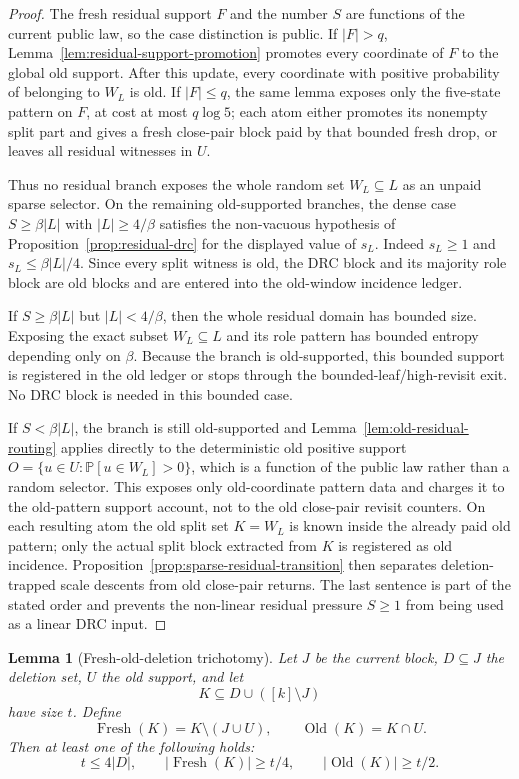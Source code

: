 \documentclass[11pt]{article}
\newtheorem{lemma}[theorem]{Lemma}
\newcommand{\Prb}{\mathbb P}
\begin{document}
\begin{proof}
The fresh residual support $F$ and the number $S$ are functions of the
current public law, so the case distinction is public.  If $|F|>q$,
Lemma~\ref{lem:residual-support-promotion} promotes every coordinate of $F$
to the global old support.  After this update, every coordinate with positive
probability of belonging to $W_L$ is old.  If $|F|\le q$, the same lemma
exposes only the five-state pattern on $F$, at cost at most $q\log 5$; each
atom either promotes its nonempty split part and gives a fresh close-pair block
paid by that bounded fresh drop, or leaves all residual witnesses in $U$.

Thus no residual branch exposes the whole random set $W_L\subseteq L$ as an
unpaid sparse selector.  On the remaining old-supported branches, the dense case
$S\ge\beta |L|$ with $|L|\ge4/\beta$ satisfies the non-vacuous hypothesis of
Proposition~\ref{prop:residual-drc} for the displayed value of $s_L$.  Indeed
$s_L\ge1$ and $s_L\le\beta |L|/4$.  Since every split witness is old, the DRC
block and its majority role block are old blocks and are entered into the
old-window incidence ledger.

If $S\ge\beta |L|$ but $|L|<4/\beta$, then the whole residual domain has bounded
size.  Exposing the exact subset $W_L\subseteq L$ and its role pattern has
bounded entropy depending only on $\beta$.  Because the branch is old-supported,
this bounded support is registered in the old ledger or stops through the
bounded-leaf/high-revisit exit.  No DRC block is needed in this bounded case.

If $S<\beta |L|$, the branch is still old-supported and
Lemma~\ref{lem:old-residual-routing} applies directly to the deterministic old
positive support $O=\{u\in U:\Prb[u\in W_L]>0\}$, which is a function of the
public law rather than a random selector.  This exposes only old-coordinate
pattern data and charges it to the old-pattern support account, not to the
old close-pair revisit counters.  On each resulting atom the old split set
$K=W_L$ is known inside the already paid old pattern; only the actual split
block extracted from $K$ is registered as old incidence.  Proposition~\ref{prop:sparse-residual-transition}
then separates deletion-trapped scale descents from old close-pair returns.
The last sentence is part of the stated order and prevents the non-linear
residual pressure $S\ge1$ from being used as a linear DRC input.
\end{proof}

\begin{lemma}[Fresh-old-deletion trichotomy]
\label{lem:fresh-old-trichotomy}
Let $J$ be the current block, $D\subseteq J$ the deletion set, $U$ the old
support, and let
\[
  K\subseteq D\cup ([k]\setminus J)
\]
have size $t$.  Define
\[
  \operatorname{Fresh}(K)=K\setminus (J\cup U),
  \qquad
  \operatorname{Old}(K)=K\cap U.
\]
Then at least one of the following holds:
\[
  t\le 4|D|,\qquad
  |\operatorname{Fresh}(K)|\ge t/4,\qquad
  |\operatorname{Old}(K)|\ge t/2.
\]
\end{lemma}
\end{document}
